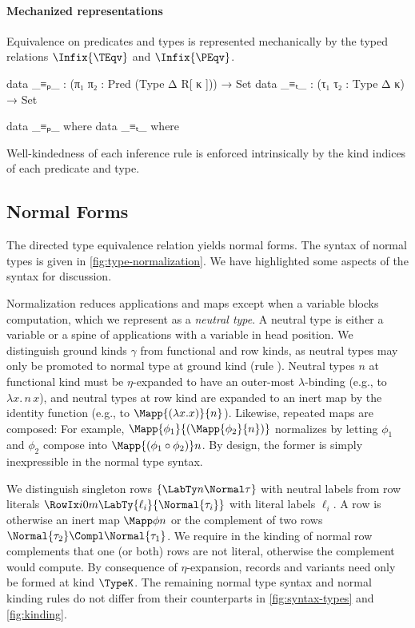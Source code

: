 \paragraph{Mechanized representations}
Equivalence on predicates and types is represented mechanically by the typed relations $\Infix{\TEqv}$ and $\Infix{\PEqv}$.

\begin{AgdaAlign}
\begin{code}
  data _≡ₚ_ : (π₁ π₂ : Pred (Type Δ R[ κ ])) → Set
  data _≡ₜ_ : (τ₁ τ₂ : Type Δ κ) → Set 
\end{code}
\begin{code}[hide]
  data _≡ₚ_ where
  data _≡ₜ_ where
\end{code}
\end{AgdaAlign}

\Ni Well-kindedness of each inference rule is enforced intrinsically by the kind indices of each predicate and type.



\subsection{Normal Forms}
\label{sec:normal-forms}

The directed type equivalence relation yields normal forms. The syntax of normal types is given in \cref{fig:type-normalization}. We have highlighted some aspects of the syntax for discussion.



Normalization reduces applications and maps except when a variable blocks computation, which we represent as a \emph{neutral type}. A neutral type is either a variable or a spine of applications with a variable in head position. We distinguish ground kinds $\gamma$ from functional and row kinds, as neutral types may only be promoted to normal type at ground kind (rule ). Neutral types $n$ at functional kind must be $\eta$-expanded to have an outer-most $\lambda$-binding (e.g., to $\lambda x. \, n\, x$), and neutral types at row kind are expanded to an inert map by the identity function (e.g., to $\Mapp {(\lambda x. x)} {n}$). Likewise, repeated maps are composed: For example, $\Mapp {\phi_{1}} {(\Mapp {\phi_{2}} {n})}$ normalizes by letting $\phi_{1}$ and $\phi_{2}$ compose into $\Mapp {(\phi_{1} \circ \phi_{2})} n$. By design, the former is simply inexpressible in the normal type syntax.

We distinguish singleton rows $\{\LabTy n \Normal \tau\}$ with neutral labels from row literals $\RowIx i 0 m {\LabTy {\ell_i} {\Normal {\tau_i}}}$ with literal labels $\ell_i$. A row is otherwise an inert map $\Mapp \phi n$ or the complement of two rows $\Normal{\tau_2} \Compl \Normal{\tau_1}$. We require in the kinding of normal row complements \kruleNF{$\Compl$} that one (or both) rows are not literal, otherwise the complement would compute. By consequence of $\eta$-expansion, records and variants need only be formed at kind $\TypeK$. The remaining normal type syntax and normal kinding rules do not differ from their counterparts in \cref{fig:syntax-types} and \cref{fig:kinding}.

